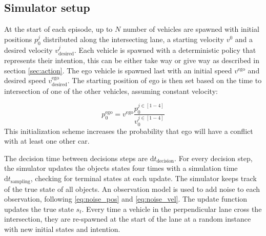 	\subsection{Simulator setup}
	\label{sec:simulation_setup}
	
	At the start of each episode, up to $N$ number of vehicles are spawned with initial positions $p^j_0$ distributed along the intersecting lane, a starting velocity $v^0$ and a desired velocity $v^j_\mathrm{desired}$. Each vehicle is spawned with a deterministic policy that represents their intention, this can be either take way or give way as described in section \ref{sec:action}. The ego vehicle is spawned last with an initial speed $v^\mathrm{ego}$ and desired speed $v^\mathrm{ego}_\mathrm{desired}$. The starting position of ego is then set based on the time to intersection of one of the other vehicles, assuming constant velocity: 
	
	\begin{equation}
		p^\mathrm{ego}_0 = v^\mathrm{ego} \frac{p^{j\in[1-4]}_0}{v^{j\in[1-4]}_0}
	\end{equation}
	This initialization scheme increases the probability that ego will have a conflict with at least one other car. 
	
	The decision time between decisions steps are $\mathrm{d}t_{\text{decision}}$. For every decision step, the simulator updates the objects states four times with a simulation time $\mathrm{d}t_{\text{sampling}}$, checking for terminal states at each update. 
	The simulator keeps track of the true state of all objects. An observation model is used to add noise to each observation, following \ref{eq:noise_pos} and \ref{eq:noise_vel}. The update function updates the true state $s_t$. 
	Every time a vehicle in the perpendicular lane cross the intersection, they are re-spawned at the start of the lane at a random instance with new initial states and intention.
	
